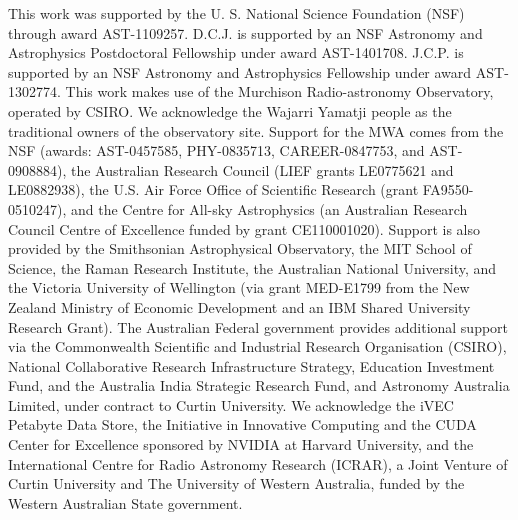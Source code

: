 \documentclass[preprint2,apjl,numberedappendix,twocolappendix,appendixfloats]{emulateapj}
\begin{document}
This work was supported by the U. S. National Science Foundation (NSF) through award AST-1109257. D.C.J. is supported by an NSF Astronomy and Astrophysics Postdoctoral Fellowship under award AST-1401708. J.C.P. is supported by an NSF Astronomy and Astrophysics Fellowship under award AST-1302774. This work makes use of the Murchison Radio-astronomy Observatory, operated by CSIRO. We acknowledge the Wajarri Yamatji people as the traditional owners of the observatory site. Support for the MWA comes from the NSF (awards: AST-0457585, PHY-0835713, CAREER-0847753, and AST-0908884), the Australian Research Council (LIEF grants LE0775621 and LE0882938), the U.S. Air Force Office of Scientific Research (grant FA9550-0510247), and the Centre for All-sky Astrophysics (an Australian Research Council Centre of Excellence funded by grant CE110001020). Support is also provided by the Smithsonian Astrophysical Observatory, the MIT School of Science, the Raman Research Institute, the Australian National University, and the Victoria University of Wellington (via grant MED-E1799 from the New Zealand Ministry of Economic Development and an IBM Shared University Research Grant). The Australian Federal government provides additional support via the Commonwealth Scientific and Industrial Research Organisation (CSIRO), National Collaborative Research Infrastructure Strategy, Education Investment Fund, and the Australia India Strategic Research Fund, and Astronomy Australia Limited, under contract to Curtin University. We acknowledge the iVEC Petabyte Data Store, the Initiative in Innovative Computing and the CUDA Center for Excellence sponsored by NVIDIA at Harvard University, and the International Centre for Radio Astronomy Research (ICRAR), a Joint Venture of Curtin University and The University of Western Australia, funded by the Western Australian State government.  


% 
\end{document}

